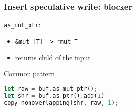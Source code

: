 \begin{frame}[fragile, t]
    \frametitle{Insert speculative write: blocker}

    \begin{exampleblock}{\texttt{as\_mut\_ptr}: }
        \begin{itemize}
            \item \texttt{\&mut [T] -> *mut T}
            \item returns \phantom{aaaaaaaaaa.} child of the input
        \end{itemize}
    \end{exampleblock}

    \begin{block}{\phantom{\xmark} Common pattern}
        \begin{lstlisting}[language=rust, basicstyle=\ttfamily\scriptsize]
let raw = buf.as_mut_ptr();
let shr = buf.as_ptr().add(1);
copy_nonoverlapping(shr, raw, 1);
        \end{lstlisting}
    \end{block}


\end{frame}
